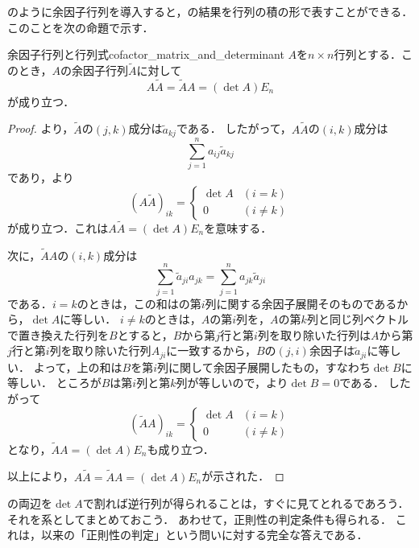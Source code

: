 のように余因子行列を導入すると，の結果を行列の積の形で表すことができる．
このことを次の命題で示す．

\begin{prop}{余因子行列と行列式}{cofactor_matrix_and_determinant}
  $A$を$n \times n$行列とする．このとき，$A$の余因子行列$\tilde{A}$に対して
  \[
  A \tilde{A} = \tilde{A} A = (\det A) E_n
  \]
  が成り立つ．
\end{prop}

\begin{tleftbar}
\begin{proof}
  より，$\tilde{A}$の$(j,k)$成分は$\tilde{a}_{kj}$である．
  したがって，$A\tilde{A}$の$(i,k)$成分は
  \[
    \sum_{j=1}^{n} a_{ij} \tilde{a}_{kj}
  \]
  であり，より
  \[
    (A\tilde{A})_{ik}
    =
    \begin{cases}
      \det A & (i = k) \\
      0 & (i \ne k)
    \end{cases}
  \]
  が成り立つ．これは$A\tilde{A} = (\det A)E_n$を意味する．

  次に，$\tilde{A}A$の$(i,k)$成分は
  \[
    \sum_{j=1}^{n} \tilde{a}_{ji} a_{jk}
    = \sum_{j=1}^{n} a_{jk} \tilde{a}_{ji}
  \]
  である．$i = k$のときは，この和はの第$i$列に関する余因子展開そのものであるから，$\det A$に等しい．
  $i \ne k$のときは，$A$の第$i$列を，$A$の第$k$列と同じ列ベクトルで置き換えた行列を$B$とすると，$B$から第$j$行と第$i$列を取り除いた行列は$A$から第$j$行と第$i$列を取り除いた行列$A_{ji}$に一致するから，$B$の$(j,i)$余因子は$\tilde{a}_{ji}$に等しい．
  よって，上の和は$B$を第$i$列に関して余因子展開したもの，すなわち$\det B$に等しい．
  ところが$B$は第$i$列と第$k$列が等しいので，より$\det B = 0$である．
  したがって
  \[
    (\tilde{A}A)_{ik}
    =
    \begin{cases}
      \det A & (i = k) \\
      0 & (i \ne k)
    \end{cases}
  \]
  となり，$\tilde{A}A = (\det A)E_n$も成り立つ．

  以上により，$A\tilde{A} = \tilde{A}A = (\det A)E_n$が示された．
\end{proof}
\end{tleftbar}

の両辺を$\det A$で割れば逆行列が得られることは，すぐに見てとれるであろう．
それを系としてまとめておこう．
あわせて，正則性の判定条件も得られる．
これは，以来の「正則性の判定」という問いに対する完全な答えである．

